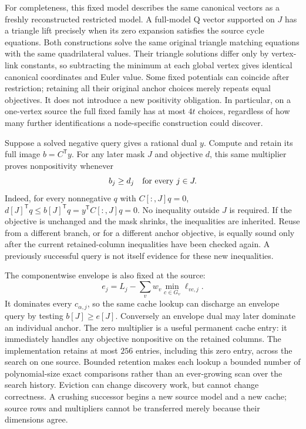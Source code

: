 For completeness, this fixed model describes the same canonical vectors
as a freshly reconstructed restricted model.  A full-model Q vector
supported on $J$ has a triangle lift precisely when its zero expansion
satisfies the source cycle equations.  Both constructions solve the same
original triangle matching equations with the same quadrilateral values.
Their triangle solutions differ only by vertex-link constants, so
subtracting the minimum at each global vertex gives identical canonical
coordinates and Euler value.  Some fixed potentials can coincide after
restriction; retaining all their original anchor choices merely repeats
equal objectives.  It does not introduce a new positivity obligation.
In particular, on a one-vertex source the full fixed family has at most
$4t$ choices, regardless of how many further identifications a node-specific
construction could discover.

Suppose a solved negative query gives a rational dual $y$.  Compute and
retain its full image $b=C^{\mathsf T}y$.  For any later mask $J$ and
objective $d$, this same multiplier proves nonpositivity whenever
\[
 b_j\ge d_j\quad\hbox{for every }j\in J.
\]
Indeed, for every nonnegative $q$ with $C[:,J]q=0$,
$d[J]^{\mathsf T}q\le b[J]^{\mathsf T}q
=y^{\mathsf T}C[:,J]q=0$.
No inequality outside $J$ is required.  If the objective is unchanged and
the mask shrinks, the inequalities are inherited.  Reuse from a different
branch, or for a different anchor objective, is equally sound only after
the current retained-column inequalities have been checked again.  A
previously successful query is not itself evidence for these new
inequalities.

The componentwise envelope is also fixed at the source:
\[
 e_j=L_j-\sum_v w_v\min_{c\in G_v}\ell_{vc,j}.
\]
It dominates every $c_{\alpha,j}$, so the same cache lookup can discharge an
envelope query by testing $b[J]\ge e[J]$.  Conversely an envelope dual may
later dominate an individual anchor.  The zero multiplier is a useful
permanent cache entry: it immediately handles any objective nonpositive on
the retained columns.  The implementation retains at most $256$ entries,
including this zero entry, across the search on one source.  Bounded
retention makes each lookup a bounded number of polynomial-size exact
comparisons rather than an ever-growing scan over the search history.
Eviction can change discovery work, but cannot change correctness.  A
crushing successor begins a new source model and a new cache; source rows
and multipliers cannot be transferred merely because their dimensions agree.

